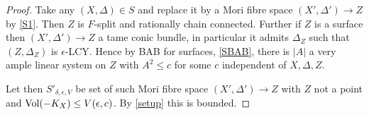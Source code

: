 %
\begin{proof}
	Take any $(X,\Delta)\in S$ and replace it by a Mori fibre space $(X',\Delta') \to Z$ by \autoref{S1}. Then $Z$ is $F$-split and rationally chain connected. Further if $Z$ is a surface then $(X',\Delta')\to Z$ a tame conic bundle, in particular it admits $\Delta_{Z}$ such that $(Z,\Delta_{Z})$ is $\epsilon$-LCY. Hence by BAB for surfaces, \autoref{SBAB}, there is $|A|$ a very ample linear system on $Z$ with $A^{2}\leq c$ for some $c$ independent of $X,\Delta,Z$. 
	
	Let then $S'_{\delta,\epsilon,V}$ be set of such Mori fibre space $(X',\Delta') \to Z$ with $Z$ not a point and $\text{Vol}(-K_{X})\leq V(\epsilon,c)$. By \autoref{setup} this is bounded.	
	\end{proof}

%
%
	
	
%